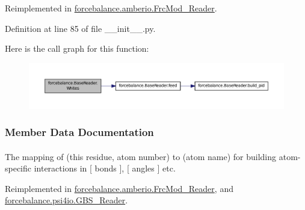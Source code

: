 \-Reimplemented in \hyperlink{classforcebalance_1_1amberio_1_1FrcMod__Reader_a684b946f7faca6589c8ed49e77e31f73}{forcebalance.\-amberio.\-Frc\-Mod\-\_\-\-Reader}.



\-Definition at line 85 of file \-\_\-\-\_\-init\-\_\-\-\_\-.\-py.



\-Here is the call graph for this function\-:\nopagebreak
\begin{figure}[H]
\begin{center}
\leavevmode
\includegraphics[width=350pt]{classforcebalance_1_1BaseReader_af2af8a559625614474a1c6fe245b5e13_cgraph}
\end{center}
\end{figure}




\subsubsection{\-Member \-Data \-Documentation}
\hypertarget{classforcebalance_1_1BaseReader_a2c46ad6b66cf09a30e917ce4a1997e2a}{
\paragraph[{adict}]{}}\label{classforcebalance_1_1BaseReader_a2c46ad6b66cf09a30e917ce4a1997e2a}


\-The mapping of (this residue, atom number) to (atom name) for building atom-\/specific interactions in \mbox{[} bonds \mbox{]}, \mbox{[} angles \mbox{]} etc. 



\-Reimplemented in \hyperlink{classforcebalance_1_1amberio_1_1FrcMod__Reader_ae3b36131778cad32336f88fdb6d724ee}{forcebalance.\-amberio.\-Frc\-Mod\-\_\-\-Reader}, and \hyperlink{classforcebalance_1_1psi4io_1_1GBS__Reader_aa7cbae977f7e9a4e14ba1d45f62bb5fa}{forcebalance.\-psi4io.\-G\-B\-S\-\_\-\-Reader}.



